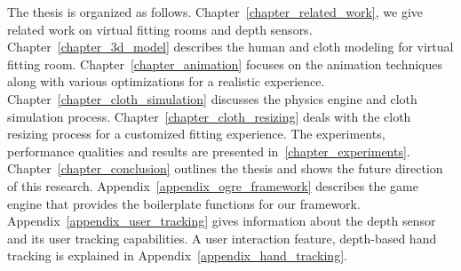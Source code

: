 The thesis is organized as follows. Chapter~\ref{chapter_related_work}, we give related work on virtual fitting rooms and depth sensors. Chapter~\ref{chapter_3d_model} describes the human and cloth modeling for virtual fitting room. Chapter~\ref{chapter_animation} focuses on the animation techniques along with various optimizations for a realistic experience. Chapter~\ref{chapter_cloth_simulation} discusses the physics engine and cloth simulation process. Chapter~\ref{chapter_cloth_resizing} deals with the cloth resizing process for a customized fitting experience. The experiments, performance qualities and results are presented in~\ref{chapter_experiments}. Chapter~\ref{chapter_conclusion} outlines the thesis and shows the future direction of this research. Appendix~\ref{appendix_ogre_framework} describes the game engine that provides the boilerplate functions for our framework. Appendix~\ref{appendix_user_tracking} gives information about the depth sensor and its user tracking capabilities. A user interaction feature, depth-based hand tracking is explained in Appendix~\ref{appendix_hand_tracking}.
